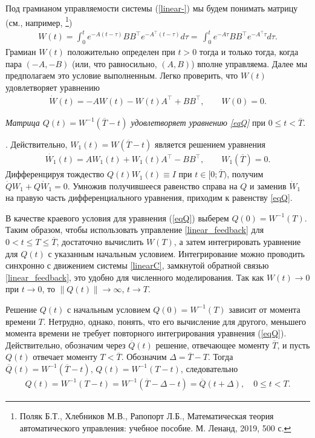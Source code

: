 \documentclass[../main.tex]{subfiles}
\begin{document}
 Под грамианом управляемости  системы (\ref{linear-}) мы будем понимать   матрицу (см., например, \footnote{Поляк Б.Т., Хлебников М.В., Рапопорт Л.Б., Математическая теория автоматического управления: учебное пособие. М. Ленанд, 2019, 500 с.})
\begin{gather}\label{gram_Stationary}
	W(t) = \int_0^t e^{-A(t-\tau)}BB^\top e^{-A^{\top}(t-\tau)} d\tau=\,\int_0^t e^{-A\tau}BB^\top e^{-A^\top{\tau}}d\tau.
\end{gather}
Грамиан $W(t)$ положительно определен при $t>0$ тогда и только тогда, когда пара $(-A,-B)$ (или, что равносильно, $(A,B)$) вполне управляема. Далее мы предполагаем это условие выполненным. Легко проверить, что $W(t)$ удовлетворяет уравнению
\begin{gather*}
	\dot{W}(t) = -A W(t)-W(t) A^\top +B B^\top,  \qquad W(0) = 0.
\end{gather*}
\begin{utv}
{\it Матрица $Q(t)=W^{-1}(\overline{T}-t)$ удовлетворяет уравнению {\rm \ref{eqQ}}} при $0 \leqslant t < \overline{T} $.
\end{utv}
\doc. Действительно, $W_1(t)=W(\overline{T}-t)$ является решением уравнения 
\begin{gather*}
	\dot{W_1}(t) = A W_1(t)+W_1(t) A^\top -B B^\top,  \qquad W_1(\overline{T}) = 0.
\end{gather*}
Дифференцируя тождество $Q(t)W_1(t)\equiv I$ при $ t \in [0;\overline{T})$, получим
$\dot{Q}W_1+Q\dot{W}_1=0 $. Умножив получившееся равенство справа на $Q$
и заменив $\dot{W}_1$ на правую часть дифференциального уравнения, приходим к равенству 
\eqref{eqQ}.

В качестве краевого условия для уравнения (\ref{eqQ}) выберем $Q(0)=W^{-1}(T)$. Таким образом, чтобы использовать управление \eqref{linear_feedback} для $0<t \leqslant T \leqslant \overline{T}$, достаточно вычислить $W(T)$, а затем интегрировать уравнение для $Q(t)$  с указанным начальным условием. Интегрирование можно проводить синхронно с движением системы \eqref{linearC}, замкнутой обратной связью \eqref{linear_feedback}, это удобно для численного моделирования. Так как $W(t)\to 0$ при $t\to 0$, то $\|Q(t) \|\to \infty$, $t\to T$.


Решение $Q(t)$ с начальным условием $Q(0)=W^{-1}(T)$ зависит от момента времени $T$. Нетрудно, однако, понять, что его вычисление для другого, меньшего момента времени не требует повторного интегрирования уравнения (\ref{eqQ}). Действительно, обозначим через $\overline{Q}(t)$ решение, отвечающее моменту $\overline{T}$, и пусть  $Q(t)$ отвечает моменту $T<\overline{T}$. Обозначим $\Delta = \overline{T}-T$. Тогда $\overline{Q}(t)=W^{-1}(\overline{T}-t)$,  $ Q(t)=W^{-1}(T-t)$, следовательно 
\begin{gather*}
Q(t)=W^{-1}(T-t)=W^{-1}(\overline{T}-\Delta-t)= \overline{Q}(t+\Delta), \quad 0\leqslant t <T.
\end{gather*}
\end{document}

